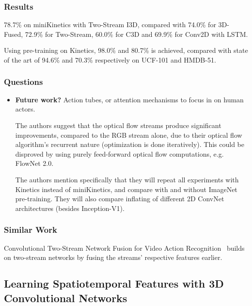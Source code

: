 \documentclass[a4paper, 12pt]{article}
\begin{document}
\subsubsection{Results}

78.7\% on miniKinetics with Two-Stream I3D, compared with 74.0\% for 3D-Fused,
72.9\% for Two-Stream, 60.0\% for C3D and 69.9\% for Conv2D with LSTM\@.

Using pre-training on Kinetics, 98.0\% and 80.7\% is achieved, compared with
state of the art of 94.6\% and 70.3\% respectively on UCF-101 and HMDB-51.


\subsubsection{Questions}

\begin{itemize}
        \item \textbf{Future work?} Action tubes, or attention mechanisms to
                focus in on human actors.

                The authors suggest that the optical flow streams produce
                significant improvements, compared to the RGB stream alone, due
                to their optical flow algorithm's recurrent nature
                (optimization is done iteratively).  This could be disproved by
                using purely feed-forward optical flow computations, e.g.
                FlowNet 2.0.

                The authors mention specifically that they will repeat all
                experiments with Kinetics instead of miniKinetics, and compare
                with and without ImageNet pre-training. They will also compare
                inflating of different 2D ConvNet architectures (besides
                Inception-V1).
\end{itemize}

\subsubsection{Similar Work}

Convolutional Two-Stream Network Fusion for Video Action
Recognition~\citet{DBLP:journals/corr/FeichtenhoferPZ16} builds on two-stream
networks by fusing the streams' respective features earlier.


\subsection{Learning Spatiotemporal Features with 3D Convolutional
            Networks\citet{DBLP:journals/corr/TranBFTP14}}
\end{document}
